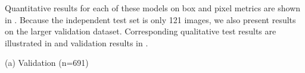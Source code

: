 \documentclass{article}
\begin{document}
Quantitative results for each of these models on box and pixel metrics are shown in
  .
Because the independent test set is only 121 images, we also present results on the larger validation
  dataset.
Corresponding qualitative test results are illustrated in  and validation
  results in .


\newcommand{\tb}[1]{\textbf{#1}}

\begin{table}[t]
\caption[]{
    Results for MaskRCNN and VIT models (suffix -p: pretrained, -s: scratch on test and validation sets.
    Evaluated with box and pixel metrics --- AP (ppv-tpr area) \cite{powers_evaluation_2011} and AUC (tpr-fpr area), F1, and TPR (recall) --- computed via scikit-learn \cite{scikit-learn}.
    Pretrained models outperform.
    Note: VIT-sseg was tuned more operated at full resolution; MaskRCNN, DINO, and YOLO used resized images and may yield better results with similar effort.
}
\label{tab:model_results}
\centering

(a) Validation (n=691)


\end{table}
\end{document}
